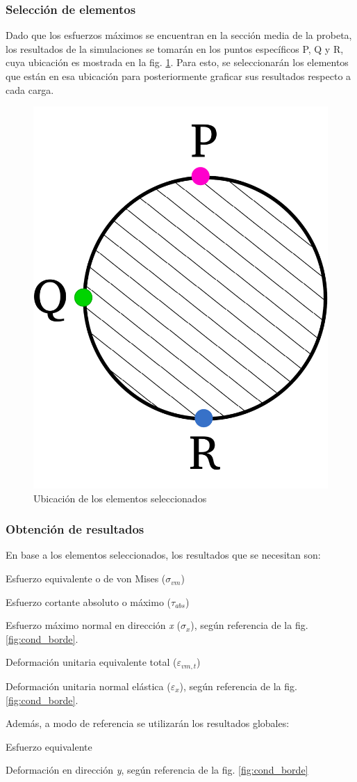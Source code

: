 \newpage

\subsubsection{Selección de elementos}
Dado que los esfuerzos máximos se encuentran en la sección media de la probeta, los resultados de la simulaciones se tomarán en los puntos específicos P, Q y R, cuya ubicación es mostrada en la fig. \ref{fig:diag_pqr}. Para esto, se seleccionarán los elementos que están en esa ubicación para posteriormente graficar sus resultados respecto a cada carga.

\begin{figure}[h]
\centering
\includegraphics[width=0.3\linewidth]{Imagenes/diagelem_pqr.pdf}
\caption{Ubicación de los elementos seleccionados}
\label{fig:diag_pqr}
\end{figure}

\subsubsection{Obtención de resultados}
En base a los elementos seleccionados, los resultados que se necesitan son:
\begin{itemize*}
	\item Esfuerzo equivalente o de von Mises ($\sigma_{vm}$)
	\item Esfuerzo cortante absoluto o máximo ($\tau_{abs}$)
	\item Esfuerzo máximo normal en dirección \textit{x} ($\sigma_{x}$), según referencia de la fig. \ref{fig:cond_borde}.
	\item Deformación unitaria equivalente total ($\varepsilon_{vm,t}$)
	\item Deformación unitaria normal elástica ($\varepsilon_{x}$),  según referencia de la fig. \ref{fig:cond_borde}.
\end{itemize*}

Además, a modo de referencia se utilizarán los resultados globales:
\begin{itemize*}
	\item Esfuerzo equivalente
	\item Deformación en dirección \textit{y}, según referencia de la fig. \ref{fig:cond_borde}
\end{itemize*}

